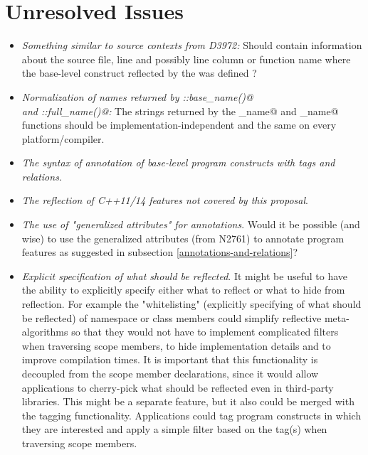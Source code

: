 \section{Unresolved Issues}
\label{section-issues}

\begin{itemize}
	\item {\em Something similar to source contexts from D3972:} Should {} contain information
	about the source file, line and possibly line column or function name where the base-level construct
	reflected by the {} was defined ?

	\item {\em Normalization of names returned by \verb@Named::base_name()@\\and \verb@NamedScoped::full_name()@:}
	The strings returned by the \verb@base_name@ and \verb@full_name@ functions should be
	implementation-independent and the same on every platform/compiler.

	\item {\em The syntax of annotation of base-level program constructs with tags and relations}.

	\item {\em The reflection of C++11/14 features not covered by this proposal}.

	\item {\em The use of "generalized attributes" for annotations}. Would it be possible
	(and wise) to use the generalized attributes (from N2761) to annotate program features
	as suggested in subsection \ref{annotations-and-relations}?

	\item {\em Explicit specification of what should be reflected}. It might be useful to have
	the ability to explicitly specify either what to reflect or what to hide from reflection.
	For example the "whitelisting" (explicitly specifying of what should be reflected) of namespace
	or class members could simplify reflective meta-algorithms so that they would not have
	to implement complicated filters when traversing scope members, to hide implementation details and
	to improve compilation times. It is important that this functionality is decoupled from the
	scope member declarations, since it would allow applications to cherry-pick what should be
	reflected even in third-party libraries.
	This might be a separate feature, but it also could be merged with the tagging functionality.
	Applications could tag program constructs in which they are interested and apply a simple
	filter based on the tag(s) when traversing scope members.
\end{itemize}
